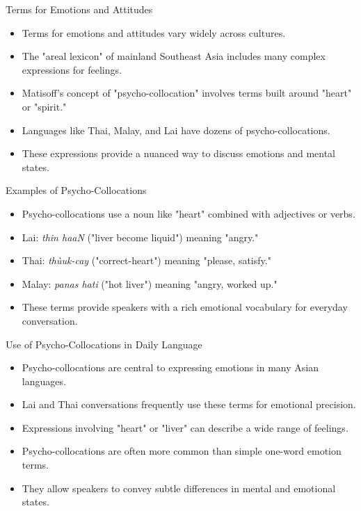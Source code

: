 \documentclass{beamer}
\begin{document}
\begin{frame}{Terms for Emotions and Attitudes}
    \begin{itemize}
        \item Terms for emotions and attitudes vary widely across cultures.
        \item The "areal lexicon" of mainland Southeast Asia includes many complex expressions for feelings.
        \item Matisoff's concept of "psycho-collocation" involves terms built around "heart" or "spirit."
        \item Languages like Thai, Malay, and Lai have dozens of psycho-collocations.
        \item These expressions provide a nuanced way to discuss emotions and mental states.
    \end{itemize}
\end{frame}

\begin{frame}{Examples of Psycho-Collocations}
    \begin{itemize}
        \item Psycho-collocations use a noun like "heart" combined with adjectives or verbs.
        \item Lai: \textit{thin haaN} ("liver become liquid") meaning "angry."
        \item Thai: \textit{thùuk-cay} ("correct-heart") meaning "please, satisfy."
        \item Malay: \textit{panas hati} ("hot liver") meaning "angry, worked up."
        \item These terms provide speakers with a rich emotional vocabulary for everyday conversation.
    \end{itemize}
\end{frame}

\begin{frame}{Use of Psycho-Collocations in Daily Language}
    \begin{itemize}
        \item Psycho-collocations are central to expressing emotions in many Asian languages.
        \item Lai and Thai conversations frequently use these terms for emotional precision.
        \item Expressions involving "heart" or "liver" can describe a wide range of feelings.
        \item Psycho-collocations are often more common than simple one-word emotion terms.
        \item They allow speakers to convey subtle differences in mental and emotional states.
    \end{itemize}
\end{frame}
\end{document}
